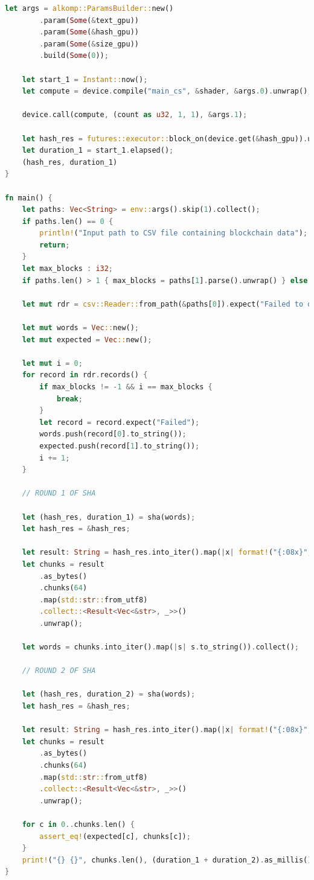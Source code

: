 \documentclass{article}
\begin{document}
\begin{lstlisting}[language=Rust, style=boxed]
    let args = alkomp::ParamsBuilder::new()
        .param(Some(&text_gpu))
        .param(Some(&hash_gpu))
        .param(Some(&size_gpu))
        .build(Some(0));

    let start_1 = Instant::now();
    let compute = device.compile("main_cs", &shader, &args.0).unwrap();

    device.call(compute, (count as u32, 1, 1), &args.1);

    let hash_res = futures::executor::block_on(device.get(&hash_gpu)).unwrap();
    let duration_1 = start_1.elapsed();
    (hash_res, duration_1)
}

fn main() {
    let paths: Vec<String> = env::args().skip(1).collect();
    if paths.len() == 0 {
        println!("Input path to CSV file containing blockchain data");
        return;
    }
    let max_blocks : i32;
    if paths.len() > 1 { max_blocks = paths[1].parse().unwrap() } else { max_blocks =  -1; }

    let mut rdr = csv::Reader::from_path(&paths[0]).expect("Failed to open file");

    let mut words = Vec::new();
    let mut expected = Vec::new();

    let mut i = 0;
    for record in rdr.records() {
        if max_blocks != -1 && i == max_blocks {
            break;
        }
        let record = record.expect("Failed");
        words.push(record[0].to_string());
        expected.push(record[1].to_string());
        i += 1;
    }

    // ROUND 1 OF SHA

    let (hash_res, duration_1) = sha(words);
    let hash_res = &hash_res;

    let result: String = hash_res.into_iter().map(|x| format!("{:08x}", x)).collect();
    let chunks = result
        .as_bytes()
        .chunks(64)
        .map(std::str::from_utf8)
        .collect::<Result<Vec<&str>, _>>()
        .unwrap();

    let words = chunks.into_iter().map(|s| s.to_string()).collect();

    // ROUND 2 OF SHA

    let (hash_res, duration_2) = sha(words);
    let hash_res = &hash_res;

    let result: String = hash_res.into_iter().map(|x| format!("{:08x}", x)).collect();
    let chunks = result
        .as_bytes()
        .chunks(64)
        .map(std::str::from_utf8)
        .collect::<Result<Vec<&str>, _>>()
        .unwrap();

    for c in 0..chunks.len() {
        assert_eq!(expected[c], chunks[c]);
    }
    print!("{} {}", chunks.len(), (duration_1 + duration_2).as_millis());
}
\end{lstlisting}
\end{document}
